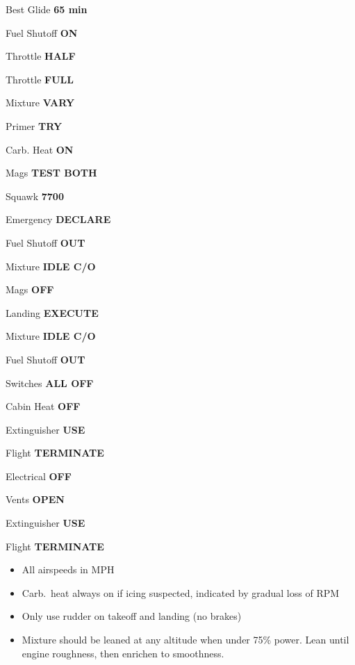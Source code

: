 \documentclass{article}
\begin{document}
\begin{multicols*}{3}
Best Glide \dotfill \textbf{65 min}

Fuel Shutoff \dotfill \textbf{ON}

Throttle \dotfill \textbf{HALF}

Throttle \dotfill \textbf{FULL}

Mixture \dotfill \textbf{VARY}

Primer \dotfill \textbf{TRY}

Carb. Heat \dotfill \textbf{ON}

Mags \dotfill \textbf{TEST BOTH}

\colorbox{orange!80}{}

Squawk \dotfill \textbf{7700}

Emergency \dotfill \textbf{DECLARE}

Fuel Shutoff \dotfill \textbf{OUT}

Mixture \dotfill \textbf{IDLE C/O}

Mags \dotfill \textbf{OFF}

Landing \dotfill \textbf{EXECUTE}

\colorbox{red!80}{}

Mixture \dotfill \textbf{IDLE C/O}

Fuel Shutoff \dotfill \textbf{OUT}

Switches \dotfill \textbf{ALL OFF}

Cabin Heat \dotfill \textbf{OFF}

Extinguisher \dotfill \textbf{USE}

Flight \dotfill \textbf{TERMINATE} \\

\colorbox{red!80}{}

Electrical \dotfill \textbf{OFF}

Vents \dotfill \textbf{OPEN}

Extinguisher \dotfill \textbf{USE}

\colorbox{orange!80}{}

Flight \dotfill \textbf{TERMINATE} \\

\colorbox{orange!80}{}

\begin{itemize}
\item All airspeeds in MPH

\item Carb.\ heat always on if icing suspected, indicated by gradual loss of RPM

\item Only use rudder on takeoff and landing (no brakes)

\item Mixture should be leaned at any altitude when under 75\% power. Lean until engine roughness, then enrichen to smoothness.
\end{itemize}

\end{multicols*}
\end{document}
